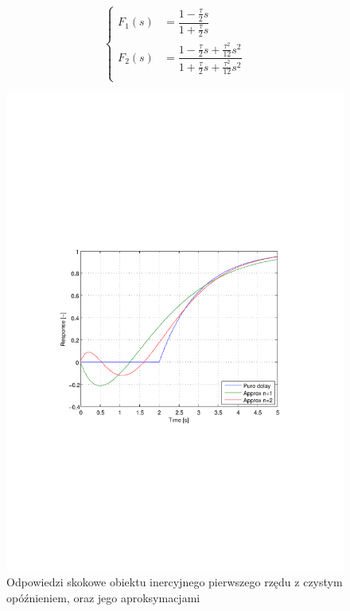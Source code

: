 \documentclass[12pt]{article}
\begin{document}
\begin{equation*}
	\begin{cases}
		F_1(s) & = \dfrac{1-\frac{\tau}{2}s}{1+\frac{\tau}{2}s} \\[0.5cm]
		F_2(s) & = \dfrac	{1-\frac{\tau}{2}s+\frac{\tau^2}{12}s^2}
							{1+\frac{\tau}{2}s+\frac{\tau^2}{12}s^2}
		\\[0cm]
	\end{cases}
\end{equation*}

\newpage

\begin{figure}[!htb]
	\begin{center}
		\includegraphics[width=14cm,trim=3cm 9cm 3cm 9cm,clip]
		{../res/img/pade1_2.pdf}
	\end{center}
	\caption{Odpowiedzi skokowe obiektu inercyjnego pierwszego rzędu z czystym
	opóźnieniem, oraz jego aproksymacjami}
\end{figure}
\end{document}
